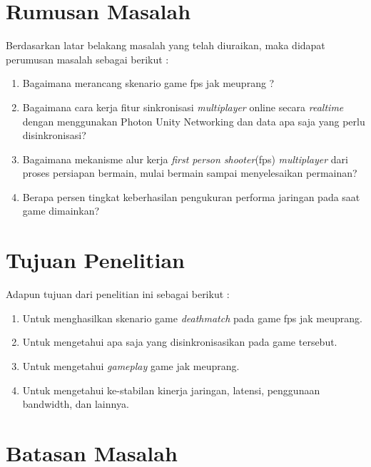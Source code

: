 \section{Rumusan Masalah}
\noindent

Berdasarkan latar belakang masalah yang telah diuraikan, maka didapat perumusan masalah sebagai berikut :
\begin{enumerate}
	\item Bagaimana merancang skenario game fps jak meuprang ?
	\item Bagaimana cara kerja fitur sinkronisasi \textit{multiplayer} online secara \textit{realtime} dengan menggunakan Photon Unity Networking dan data apa saja yang perlu disinkronisasi?
	\item Bagaimana mekanisme alur kerja \textit{first person shooter}(fps) \textit{multiplayer} dari proses persiapan bermain, mulai bermain sampai menyelesaikan permainan?
	\item Berapa persen tingkat keberhasilan pengukuran performa jaringan pada saat game dimainkan?
\end{enumerate}	
\section{Tujuan Penelitian}
\noindent

Adapun tujuan dari penelitian ini sebagai berikut :
\begin{enumerate}
	\item Untuk menghasilkan skenario game \textit{deathmatch} pada game fps jak meuprang.
	\item Untuk mengetahui apa saja yang disinkronisasikan pada game tersebut.
	\item Untuk mengetahui \textit{gameplay} game jak meuprang.
	\item Untuk mengetahui ke-stabilan kinerja jaringan, latensi, penggunaan bandwidth, dan lainnya. 
\end{enumerate}


\section{Batasan Masalah}
\noindent

